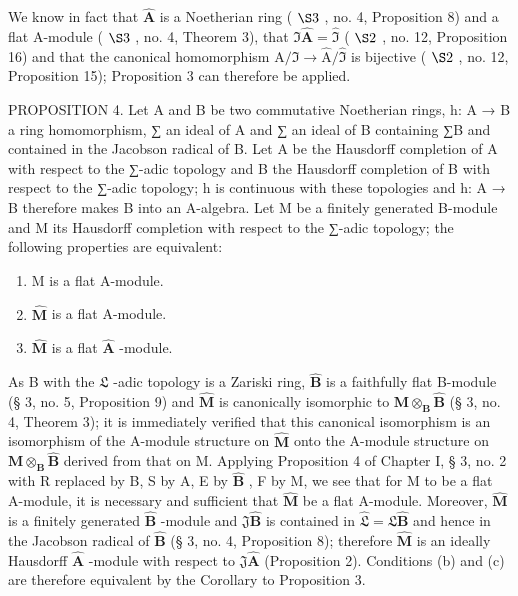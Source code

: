 We know in fact that \(\hat{\mathbf{A}}\) is a Noetherian ring ( \(\S 3\) , no. 4, Proposition 8) and a flat A-module ( \(\S 3\) , no. 4, Theorem 3), that \(\Im \hat{\mathbf{A}} = \hat{\mathfrak{I}}\) ( \(\S 2\) , no. 12, Proposition 16) and that the canonical homomorphism \(\mathrm{A} / \Im \to \hat{\mathrm{A}} / \hat{\mathfrak{I}}\) is bijective ( \(\S 2\) , no. 12, Proposition 15); Proposition 3 can therefore be applied.

PROPOSITION 4. Let A and B be two commutative Noetherian rings, h: A → B a ring homomorphism, ∑ an ideal of A and ∑ an ideal of B containing ∑B and contained in the Jacobson radical of B. Let A be the Hausdorff completion of A with respect to the ∑-adic topology and B the Hausdorff completion of B with respect to the ∑-adic topology; h is continuous with these topologies and h: A → B therefore makes B into an A-algebra. Let M be a finitely generated B-module and M its Hausdorff completion with respect to the ∑-adic topology; the following properties are equivalent:

\begin{enumerate}
\def\labelenumi{(\alph{enumi})}
\item
  M is a flat A-module.
\item
  \(\hat{\mathbf{M}}\) is a flat A-module.
\item
  \(\hat{\mathbf{M}}\) is a flat \(\hat{\mathbf{A}}\) -module.
\end{enumerate}

As B with the \(\mathfrak{L}\) -adic topology is a Zariski ring, \(\hat{\mathbf{B}}\) is a faithfully flat B-module (§ 3, no. 5, Proposition 9) and \(\hat{\mathbf{M}}\) is canonically isomorphic to \(\mathbf{M} \otimes_{\mathbf{B}} \hat{\mathbf{B}}\) (§ 3, no. 4, Theorem 3); it is immediately verified that this canonical isomorphism is an isomorphism of the A-module structure on \(\hat{\mathbf{M}}\) onto the A-module structure on \(\mathbf{M} \otimes_{\mathbf{B}} \hat{\mathbf{B}}\) derived from that on M. Applying Proposition 4 of Chapter I, § 3, no. 2 with R replaced by B, S by A, E by \(\hat{\mathbf{B}}\) , F by M, we see that for M to be a flat A-module, it is necessary and sufficient that \(\hat{\mathbf{M}}\) be a flat A-module. Moreover, \(\hat{\mathbf{M}}\) is a finitely generated \(\hat{\mathbf{B}}\) -module and \(\mathfrak{J}\hat{\mathbf{B}}\) is contained in \(\hat{\mathfrak{L}} = \mathfrak{L}\hat{\mathbf{B}}\) and hence in the Jacobson radical of \(\hat{\mathbf{B}}\) (§ 3, no. 4, Proposition 8); therefore \(\hat{\mathbf{M}}\) is an ideally Hausdorff \(\hat{\mathbf{A}}\) -module with respect to \(\mathfrak{J}\hat{\mathbf{A}}\) (Proposition 2). Conditions (b) and (c) are therefore equivalent by the Corollary to Proposition 3.


